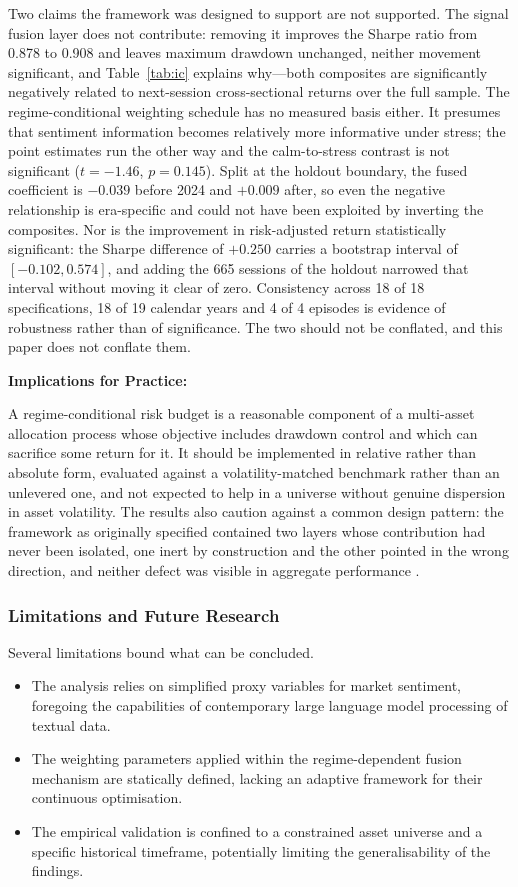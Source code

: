 Two claims the framework was designed to support are not supported. The signal fusion
layer does not contribute: removing it improves the Sharpe ratio from 0.878 to 0.908 and
leaves maximum drawdown unchanged, neither movement significant, and
Table~\ref{tab:ic} explains why---both composites are significantly negatively related to
next-session cross-sectional returns over the full sample. The regime-conditional
weighting schedule has no measured basis either. It presumes that sentiment information
becomes relatively more informative under stress; the point estimates run the other way
and the calm-to-stress contrast is not significant ($t = -1.46$, $p = 0.145$). Split at
the holdout boundary, the fused coefficient is $-0.039$ before 2024 and $+0.009$ after,
so even the negative relationship is era-specific and could not have been exploited by
inverting the composites. Nor is the improvement in risk-adjusted return statistically
significant: the Sharpe difference of $+0.250$ carries a bootstrap interval of
$[-0.102, 0.574]$, and adding the 665 sessions of the holdout narrowed that interval
without moving it clear of zero. Consistency across 18 of 18 specifications, 18 of 19
calendar years and 4 of 4 episodes is evidence of robustness rather than of significance.
The two should not be conflated, and this paper does not conflate them.

\textbf{Implications for Practice:}

A regime-conditional risk budget is a reasonable component of a multi-asset allocation
process whose objective includes drawdown control and which can sacrifice some return for
it. It should be implemented in relative rather than absolute form, evaluated against a
volatility-matched benchmark rather than an unlevered one, and not expected to help in a
universe without genuine dispersion in asset volatility. The results also caution against
a common design pattern: the framework as originally specified contained two layers whose
contribution had never been isolated, one inert by construction and the other pointed in
the wrong direction, and neither defect was visible in aggregate performance
\citep{prado16}.

\subsubsection{Limitations and Future Research}
\label{sec:future}

Several limitations bound what can be concluded.

\begin{itemize}
\item The analysis relies on simplified proxy variables for market sentiment, foregoing
the capabilities of contemporary large language model processing of textual data.
\item The weighting parameters applied within the regime-dependent fusion mechanism are
statically defined, lacking an adaptive framework for their continuous optimisation.
\item The empirical validation is confined to a constrained asset universe and a specific
historical timeframe, potentially limiting the generalisability of the findings.
\end{itemize}

